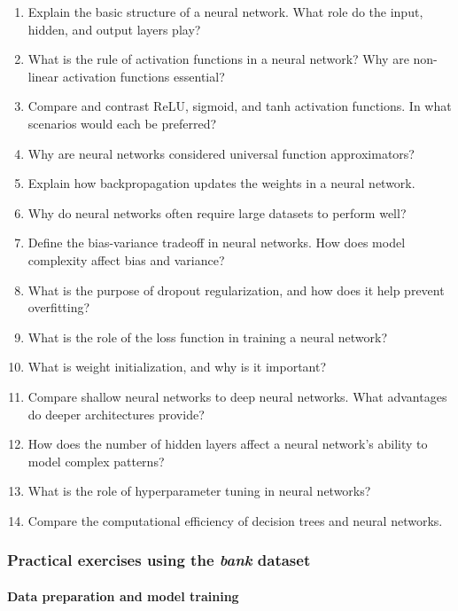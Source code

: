 \documentclass[
]{book}
\providecommand{\tightlist}{%
  \setlength{\itemsep}{0pt}\setlength{\parskip}{0pt}}
\theoremstyle{definition}
\theoremstyle{definition}
\theoremstyle{definition}
\theoremstyle{definition}
\theoremstyle{remark}
\begin{document}
\begin{enumerate}
\def\labelenumi{\arabic{enumi}.}
\tightlist
\item
  Explain the basic structure of a neural network. What role do the input, hidden, and output layers play?
\item
  What is the rule of activation functions in a neural network? Why are non-linear activation functions essential?
\item
  Compare and contrast ReLU, sigmoid, and tanh activation functions. In what scenarios would each be preferred?
\item
  Why are neural networks considered universal function approximators?
\item
  Explain how backpropagation updates the weights in a neural network.
\item
  Why do neural networks often require large datasets to perform well?
\item
  Define the bias-variance tradeoff in neural networks. How does model complexity affect bias and variance?
\item
  What is the purpose of dropout regularization, and how does it help prevent overfitting?
\item
  What is the role of the loss function in training a neural network?
\item
  What is weight initialization, and why is it important?
\item
  Compare shallow neural networks to deep neural networks. What advantages do deeper architectures provide?
\item
  How does the number of hidden layers affect a neural network's ability to model complex patterns?
\item
  What is the role of hyperparameter tuning in neural networks?
\item
  Compare the computational efficiency of decision trees and neural networks.
\end{enumerate}

\subsubsection*{\texorpdfstring{Practical exercises using the \emph{bank} dataset}{Practical exercises using the bank dataset}}\label{practical-exercises-using-the-bank-dataset-1}

\paragraph*{Data preparation and model training}\label{data-preparation-and-model-training}
\end{document}
